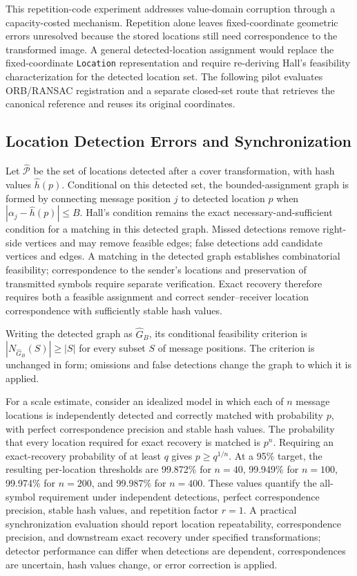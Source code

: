 \documentclass[preprint,12pt]{elsarticle}
\theoremstyle{plain}
\begin{document}
This repetition-code experiment addresses value-domain corruption through a
capacity-costed mechanism. Repetition alone leaves fixed-coordinate geometric
errors unresolved because the stored locations still need correspondence to
the transformed image. A general detected-location assignment would replace
the fixed-coordinate \texttt{Location} representation and require
re-deriving Hall's feasibility characterization for the detected location
set. The following pilot evaluates ORB/RANSAC registration and a separate
closed-set route that retrieves the canonical reference and reuses its
original coordinates.

\subsection{Location Detection Errors and Synchronization}
\label{sec:detection_errors}

Let $\widehat{\mathcal{P}}$ be the set of locations detected after a cover
transformation, with hash values $\widehat{h}(p)$. Conditional on this
detected set, the bounded-assignment graph is formed by connecting message
position $j$ to detected location $p$ when
$|\alpha_j-\widehat{h}(p)|\leq B$. Hall's condition remains the exact
necessary-and-sufficient condition for a matching in this detected graph.
Missed detections remove right-side vertices and may remove feasible edges;
false detections add candidate vertices and edges. A matching in the detected graph establishes combinatorial feasibility;
correspondence to the sender's locations and preservation of transmitted
symbols require separate verification. Exact recovery therefore requires both a feasible assignment and
correct sender--receiver location correspondence with sufficiently stable
hash values.

Writing the detected graph as $\widehat{G}_B$, its conditional feasibility
criterion is $|N_{\widehat{G}_B}(S)|\geq|S|$ for every subset $S$ of message
positions. The criterion is unchanged in form; omissions and false detections
change the graph to which it is applied.

For a scale estimate, consider an idealized model in which each of $n$
message locations is independently detected and correctly matched with
probability $p$, with perfect correspondence precision and stable hash values.
The probability that every location required for exact recovery is matched is
$p^n$. Requiring an exact-recovery probability of at least $q$ gives
$p\geq q^{1/n}$. At a 95\% target, the resulting per-location thresholds are
99.872\% for $n=40$, 99.949\% for $n=100$, 99.974\% for $n=200$, and
99.987\% for $n=400$. These values quantify the all-symbol requirement under
independent detections, perfect correspondence precision, stable hash values,
and repetition factor $r=1$. A practical synchronization evaluation should report
location repeatability, correspondence precision, and downstream exact
recovery under specified transformations; detector performance can differ
when detections are dependent, correspondences are uncertain, hash values
change, or error correction is applied.
\end{document}

